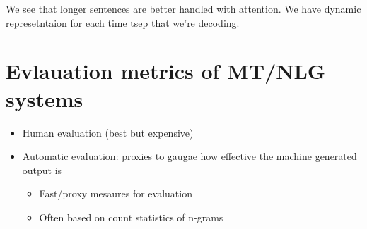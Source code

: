 \documentclass[11pt]{article}
\begin{document}
\begin{minipage}[l]{.6\linewidth}
    \centering
\end{minipage}\hfill
\begin{minipage}[r]{.35\linewidth}
    We see that longer sentences are better handled with attention. We have dynamic represetntaion for each time tsep that we're decoding.
\end{minipage}

\section{Evlauation metrics of MT/NLG systems}

\begin{itemize}
    \item Human evaluation (best but expensive)
    \item Automatic evaluation: proxies to gaugae how effective the machine generated output is \begin{itemize}
        \item Fast/proxy mesaures for evaluation
        \item Often based on count statistics of n-grams
    \end{itemize}
\end{itemize}
\end{document}
